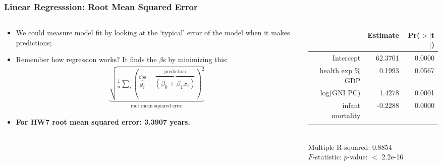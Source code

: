 \documentclass[aspectratio=169]{beamer}
\theoremstyle{principle}
\begin{document}
\begin{frame}
\frametitle{Linear Regresssion: Root Mean Squared Error}

\begin{columns}
\begin{column}{0.5\textwidth}

\begin{itemize}
\item We could measure model fit by looking at the `typical' error of the model when it makes predictions;
\bigskip

\item Remember how regression works?  It finds the $\beta$s by minimizing this:
\begin{align*}
\underbrace{\sqrt{\frac{1}{n}\sum_i(\overbrace{y_i}^{\mbox{obs}} - \overbrace{(\beta_0 + \beta_1 x_i)}^{\mbox{prediction}})^2}}_{\mbox{root mean squared error}}
\end{align*}

\item \textbf{For HW7 root mean squared error: 3.3907 years.}
\end{itemize}

\end{column}
\begin{column}{0.5\textwidth}

\begin{table}[ht]
\centering
\begin{tabular}{rrr}
  \hline
   \hline
 & Estimate & Pr($>$$|$t$|$) \\ 
  \hline
   \hline
Intercept & 62.3701 & 0.0000 \\ 
  health exp \% GDP & 0.1993 & 0.0567 \\ 
  log(GNI PC) & 1.4278 & 0.0001 \\ 
  infant mortality & -0.2288 & 0.0000 \\ 
   \hline
   \hline
   &&\\
\end{tabular}\\
\color{white}Multiple R-squared:  0.8854\\ 
$F$-statistic: $p$-value: $<$ 2.2e-16
\end{table}

\end{column}
\end{columns}

\end{frame}
\end{document}
